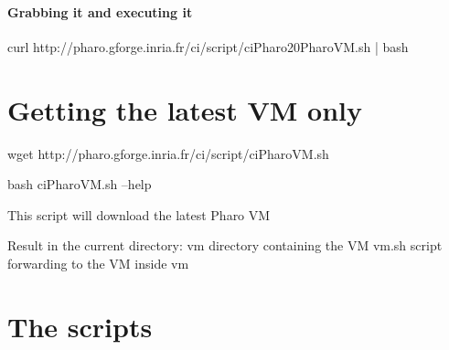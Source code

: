 \documentclass[a4paper,10pt,twoside]{book}
\begin{document}
\paragraph{Grabbing it and executing it}

\begin{code}{}
curl http://pharo.gforge.inria.fr/ci/script/ciPharo20PharoVM.sh | bash
\end{code}


\section{Getting the latest VM only}

\begin{code}{}
wget http://pharo.gforge.inria.fr/ci/script/ciPharoVM.sh
\end{code}

\begin{code}{}
bash ciPharoVM.sh --help


This script will download the latest Pharo VM

Result in the current directory:
    vm               directory containing the VM
    vm.sh            script forwarding to the VM inside vm
\end{code}





\section{The scripts}
\end{document}
